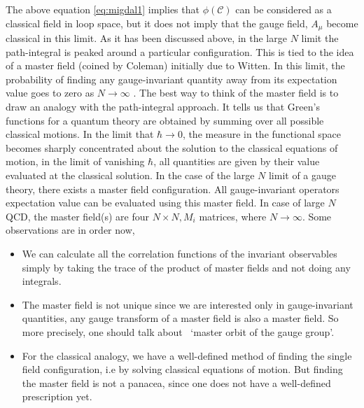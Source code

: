 The above equation \ref{eq:migdal1} implies that $ \phi(\mathcal{C})$ can be considered 
as a classical field in loop space, 
but it does not imply that the gauge field, $A_{\mu}$ become classical in this limit. 
As it has been discussed above, in the large $N$ limit the path-integral is peaked 
around a particular configuration. 
This is tied to the idea of a master field (coined by Coleman) initially due to Witten. 
In this limit, the probability of finding 
any gauge-invariant 
quantity away from its expectation value goes to zero as $N \to \infty$ 
\cite{Gopakumar:1994iq}.
The best way to think of the master field is to draw an analogy 
with the path-integral approach. 
It tells us that Green's functions for a quantum theory are obtained 
by summing over all possible classical motions. 
In the limit that $\hbar \to 0$, the measure in the functional space 
becomes sharply concentrated about the solution to
 the classical equations of motion, in the limit of vanishing $\hbar$, 
all quantities are given by their value evaluated at the classical solution. 
In the case of the large $N$ limit of a gauge theory, there exists a 
master field configuration. 
All gauge-invariant operators expectation value can be evaluated using this master field. 
In case of large $N$ QCD, the master field(s) are four $N \times N, 
M_{i}$ matrices, where $N \to \infty$.  
Some observations are in order now,  

\begin{itemize}
\item We can calculate all the correlation functions of the invariant 
observables simply by taking the trace of the product of master fields and not doing any integrals. 
\item The master field is not unique since we are interested only in 
gauge-invariant quantities, any gauge transform of a master field is also a master field. 
So more precisely, one should talk about ~`master orbit of the gauge 
group'. 
\item For the classical analogy, we have a well-defined method of 
finding the single field configuration, i.e by solving classical equations of motion. 
But finding the master field is not a panacea, since one does not have a well-defined prescription yet.
\end{itemize}   


